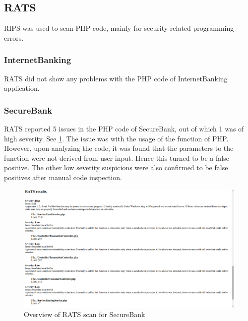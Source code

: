 \subsection{RATS}
RIPS was used to scan PHP code, mainly for security-related programming errors.

\subsubsection{InternetBanking }
RATS did not show any problems with the PHP code of InternetBanking application.

\subsubsection{SecureBank}
RATS reported 5 issues in the PHP code of SecureBank, out of which 1 was of high severity. See \ref{fig:rats_overview_secure_bank}.
The issue was with the usage of the  function of PHP. However, upon analyzing the code, it was found that the parameters to the function were not derived from user input. Hence this turned to be a false positive.
The other low severity suspicions were also confirmed to be false positives after manual code inspection.

\begin{figure}[ht]
	\centering
	\includegraphics[width=.8\linewidth]{figures/rats_overview_secure_bank.png}
	\caption{Overview of RATS scan for SecureBank}
	\label{fig:rats_overview_secure_bank}
\end{figure}